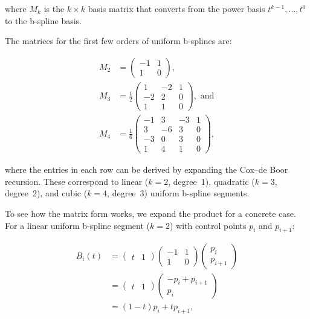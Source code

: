 where \(M_k\) is the \(k \times k\) basis matrix that converts from the power basis \(t^{k-1}, \ldots, t^0\) to the b-spline basis.

The matrices for the first few orders of uniform b-splines are:

\begin{align}
\label{eq:bsplinematrices}
M_2 &= \left(\begin{array}{cc}-1 & 1 \\
1 & 0\end{array}\right),\\
M_3 &= \frac{1}{2}\left(\begin{array}{ccc}1 & -2 & 1 \\
-2 & 2 & 0 \\
1 & 1 & 0\end{array}\right), \text{ and}\\
M_4 &= \frac{1}{6}\left(\begin{array}{cccc}-1 & 3 & -3 & 1 \\
3 & -6 & 3 & 0 \\
-3 & 0 & 3 & 0 \\
1 & 4 & 1 & 0\end{array}\right),
\end{align}

where the entries in each row can be derived by expanding the Cox--de Boor recursion.
These correspond to linear (\(k=2\), degree~1), quadratic (\(k=3\), degree~2), and cubic (\(k=4\), degree~3) uniform b-spline segments.

To see how the matrix form works, we expand the product for a concrete case.
For a linear uniform b-spline segment (\(k=2\)) with control points \(p_i\) and \(p_{i+1}\):

\begin{align}
B_i(t) &= \left(\begin{array}{cc}t & 1\end{array}\right)
\left(\begin{array}{cc}-1 & 1 \\ 1 & 0\end{array}\right)
\left(\begin{array}{c}p_i \\ p_{i+1}\end{array}\right) \nonumber \\
&= \left(\begin{array}{cc}t & 1\end{array}\right)
\left(\begin{array}{c}-p_i + p_{i+1} \\ p_i\end{array}\right) \nonumber \\
&= (1-t) p_i + t p_{i+1},
\end{align}

